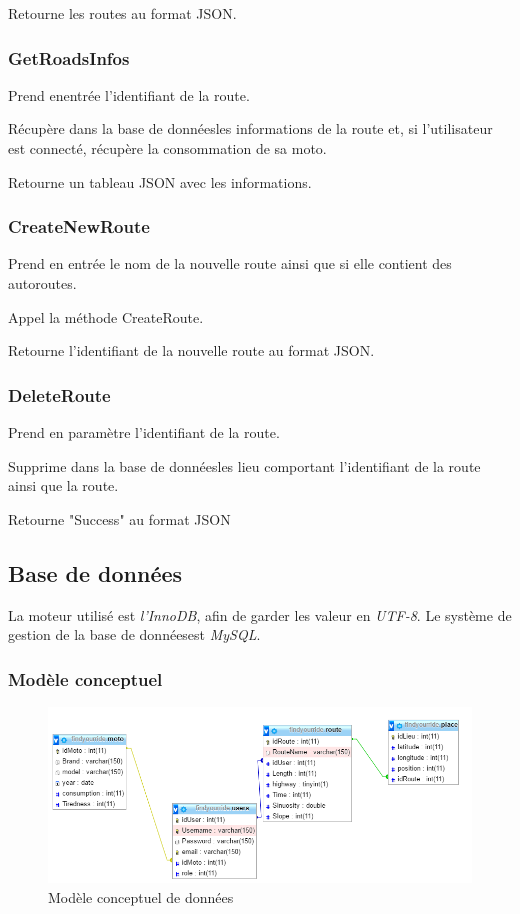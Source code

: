 \documentclass[a4paper]{article}
\newcommand{\bdd}{base de données}
\begin{document}
Retourne les routes au format JSON.


\subsubsection{GetRoadsInfos}
Prend enentrée l'identifiant de la route.

Récupère dans la \bdd les informations de la route et, si l'utilisateur est connecté, récupère la consommation de sa moto.

Retourne un tableau JSON avec les informations.

\subsubsection{CreateNewRoute}
Prend en entrée le nom de la nouvelle route ainsi que si elle contient des autoroutes.

Appel la méthode CreateRoute.

Retourne l'identifiant de la nouvelle route au format JSON.

\subsubsection{DeleteRoute}
Prend en paramètre l'identifiant de la route.

Supprime dans la \bdd les lieu comportant l'identifiant de la route ainsi que la route.

Retourne "Success" au format JSON
\newpage
\subsection{Base de données}
La moteur utilisé est \emph{l'InnoDB}, afin de garder les valeur en \emph{UTF-8}.
Le système de gestion de la \bdd est \emph{MySQL}.

\subsubsection{Modèle conceptuel}
\begin{figure}[h]
	\centering
	\includegraphics[width=\textwidth]{./Images/MCD.png}
	\caption{Modèle conceptuel de données}
\end{figure}
\end{document}

